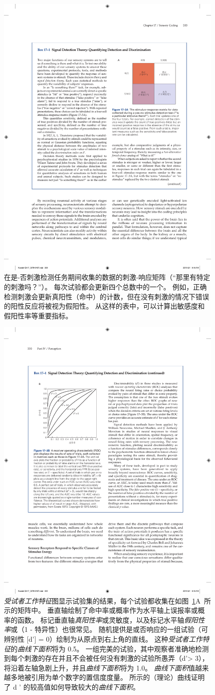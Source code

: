 \begin{figure}[htbp]
	\centering
	\includegraphics[width=0.5\linewidth]{chap17/fig_17_3_a}
	\caption{在是-否刺激检测任务期间收集的数据的刺激-响应矩阵（“那里有特定的刺激吗？”）。
		每次试验都会更新四个总数中的一个。
		例如，正确检测刺激会更新真阳性（命中）的计数，但在没有刺激的情况下错误的阳性反应将被视为假阳性。
		从这样的表中，可以计算出敏感度和假阳性率等重要指标。}
	\label{fig:17_3_a}
\end{figure}


\begin{figure}[htbp]
	\centering
	\includegraphics[width=0.55\linewidth]{chap17/fig_17_3_b}
	\caption{\textit{受试者工作特征}图显示试验集的结果，每个试验都收集在如图~\ref{fig:17_3_a}A~所示的矩阵中。
		垂直轴绘制了命中率或概率作为水平轴上误报率或概率的函数。
		标记垂直轴\textit{真阳性率}或灵敏度，以及标记水平轴\textit{假阳性率}或（1 - 特异性）也很常见。
		随机提供是或否响应的一组试验（可辨别性 [d'] = 0）绘制为从原点到右上角的直线。
		这种\textit{受试者工作特征}的\textit{曲线下面积}将为 0.5。
		一组完美的试验，其中观察者准确地检测到每个刺激的存在并且不会被任何没有刺激的试验所愚弄（d'> 3），将沿着左轴急剧上升，并且\textit{曲线下面积}将为 1.0。
		\textit{曲线下面积}值越来越多地被引用为单个数字的置信度度量。
		所示的（理论）曲线证明了 d ' 的较高值如何导致较大的\textit{曲线下面积}\cite{swets1973relative}。}
	\label{fig:17_3_b}
\end{figure}


